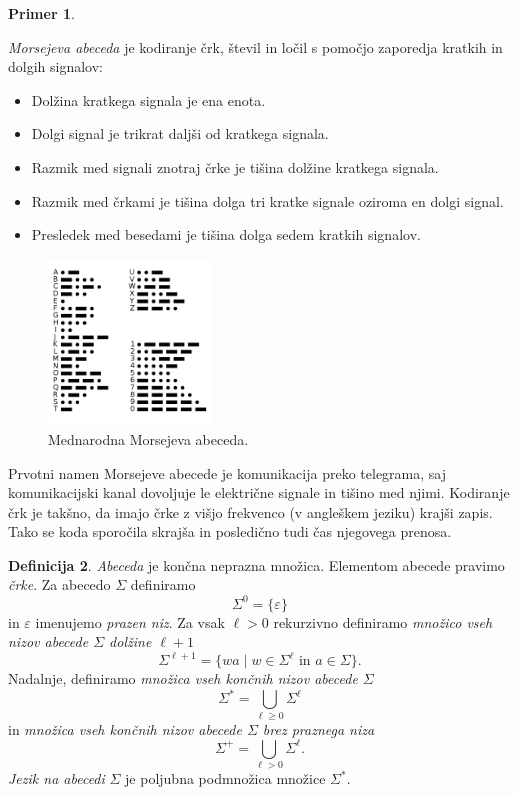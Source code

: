 \documentclass{amsart}
\theoremstyle{definition}
\newtheorem{definicija}{Definicija}[section]
\newtheorem{primer}[definicija]{Primer}
\theoremstyle{plain} %
\begin{document}
\begin{primer}\label{Morse}

    \textit{Morsejeva abeceda} je kodiranje črk, števil in ločil s pomočjo zaporedja kratkih
    in dolgih signalov:

    \begin{itemize}
        \item Dolžina kratkega signala je ena enota.
        \item Dolgi signal je trikrat daljši od kratkega signala.
        \item Razmik med signali znotraj črke je tišina dolžine kratkega signala.
        \item Razmik med črkami je tišina dolga tri kratke signale oziroma en dolgi signal.
        \item Presledek med besedami je tišina dolga sedem kratkih signalov.
    \end{itemize}
 
    \begin{figure}[h]
        \centering
        \includegraphics[width=4.3cm]{InternationalMorse.png}
        \caption{Mednarodna Morsejeva abeceda.}
        \label{fig:Morse}
    \end{figure}

    Prvotni namen Morsejeve abecede je komunikacija preko telegrama, saj komunikacijski
    kanal dovoljuje le električne signale in tišino med njimi. Kodiranje črk je takšno,
    da imajo črke z višjo frekvenco (v angleškem jeziku) krajši zapis. Tako se koda
    sporočila skrajša in posledično tudi čas njegovega prenosa.

\end{primer}

\begin{definicija}
    
    \textit{Abeceda} je končna neprazna množica. Elementom abecede pravimo \textit{črke}.
    Za abecedo $\Sigma$ definiramo
    \[
        \Sigma^0 = \{ \varepsilon \}
    \]
    in $\varepsilon$ imenujemo \textit{prazen niz}.
    Za vsak $ \ell > 0 $ rekurzivno definiramo \textit{množico vseh nizov abecede $\Sigma$
    dolžine $ \ell + 1 $}
    \[
        \Sigma^{\ell+1} = \{ wa \mid w \in \Sigma^{\ell} \text{ in } a \in \Sigma \}.
    \]
    Nadalnje, definiramo \textit{množica vseh končnih nizov abecede $\Sigma$}
    \[
        \Sigma^* = \bigcup_{\ell \geq 0} \Sigma^\ell
    \]
    in \textit{množica vseh končnih nizov abecede $\Sigma$ brez praznega niza}
    \[
        \Sigma^+ = \bigcup_{\ell > 0} \Sigma^\ell.
    \]
    \textit{Jezik na abecedi} $\Sigma$ je poljubna podmnožica množice $ \Sigma^* $.

\end{definicija}
\end{document}
